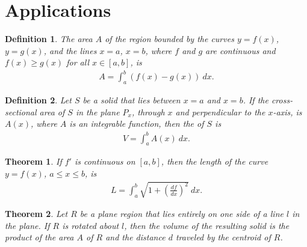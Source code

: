 \documentclass{article}
\theoremstyle{sltheorem}
\newtheorem{definition}{Definition}[section]
\newtheorem{theorem}{Theorem}[section]
\begin{document}
\section{Applications}
\begin{definition}
    The area $A$ of the region bounded by the curves $y=f(x)$, $y=g(x)$, and the lines $x=a$, $x=b$, where $f$ and $g$ are continuous and $f(x)\geq g(x)$ for all $x\in[a,b]$, is
    \begin{align*}
        A=\int_a^b \left(f(x)-g(x)\right)\:dx.
    \end{align*}
\end{definition}
\begin{definition}
    Let $S$ be a solid that lies between $x=a$ and $x=b$. If the cross-sectional area of $S$ in the plane $P_x$, through $x$ and perpendicular to the $x$-axis, is $A(x)$, where $A$ is an integrable function, then the  of $S$ is
    \begin{align*}
        V=\int_a^b A(x)\:dx.
    \end{align*}
\end{definition}
\begin{theorem}
     If $f'$ is continuous on $[a,b]$, then the length of the curve $y=f(x)$, $a\leq x \leq b$, is
    \begin{align*}
        L = \int_a^b \sqrt{1+\left(\frac{df}{dx}\right)^2}\:dx.
    \end{align*}
\end{theorem}
\begin{theorem}
     Let $R$ be a plane region that lies entirely on one side of a line $l$ in the plane. 
    If $R$ is rotated about $l$, then the volume of the resulting solid is the product of the area $A$ of $R$ and the distance $d$ traveled by the centroid of $R$.
\end{theorem}
\end{document}
